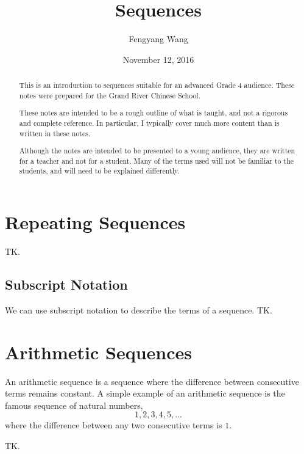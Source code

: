 \documentclass[a4paper,10pt]{report}
\title{Sequences}
\author{Fengyang Wang}
\date{November 12, 2016}
\begin{document}
\begin{abstract}

This is an introduction to sequences suitable for an advanced Grade 4 audience.
These notes were prepared for the Grand River Chinese School.

These notes are intended to be a rough outline of what is taught, and not a
rigorous and complete reference. In particular, I typically cover much more
content than is written in these notes.

Although the notes are intended to be presented to a young audience, they are
written for a teacher and not for a student. Many of the terms used will not be
familiar to the students, and will need to be explained differently.

\end{abstract}

\maketitle

\tableofcontents

\chapter{Repeating Sequences}

TK.

\section{Subscript Notation}

We can use subscript notation to describe the terms of a sequence. TK.

\chapter{Arithmetic Sequences}

An arithmetic sequence is a sequence where the difference between consecutive
terms remains constant. A simple example of an arithmetic sequence is the
famous sequence of natural numbers, \[
  1, 2, 3, 4, 5, \dots
\] where the difference between any two consecutive terms is \(1\).

TK.
\end{document}
